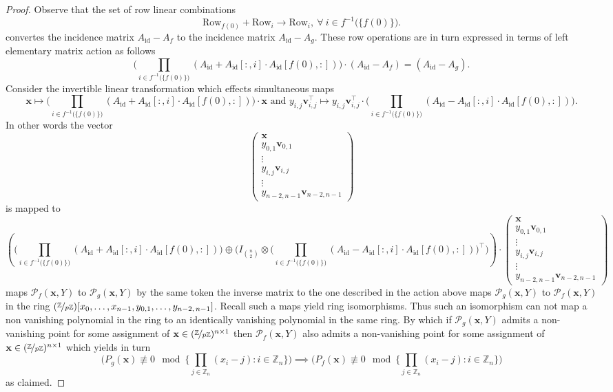 \begin{proof}
Observe that the set of row linear combinations
\[
\text{Row}_{f(0)}+\text{Row}_{i}\longrightarrow\text{Row}_{i},\ \forall\:i\in f^{-1}\big(\{f(0)\}\big).
\]
convertes the incidence matrix $A_{\text{id}}-A_{f}$ to the incidence matrix $A_{\text{id}}-A_{g}$.
These row operations are in turn expressed in terms of left elementary matrix action as follows
\[
\bigg(\prod_{i\in f^{-1}\big(\{f(0)\}\big)}(A_{\text{id}}+A_{\text{id}}[:,i]\cdot A_{\text{id}}[f(0),:])\bigg)\cdot(A_{\text{id}}-A_{f})=(A_{\text{id}}-A_{g}).
\]
Consider the invertible linear transformation which effects simultaneous maps
\[
\mathbf{x}\mapsto\bigg(\prod_{i\in f^{-1}\big(\{f(0)\}\big)}(A_{\text{id}}+A_{\text{id}}[:,i]\cdot A_{\text{id}}[f(0),:])\bigg)\cdot\mathbf{x}\text{ and }y_{i,j}\mathbf{v}_{i,j}^{\top}\mapsto y_{i,j}\mathbf{v}_{i,j}^{\top}\cdot\bigg(\prod_{i\in f^{-1}\big(\{f(0)\}\big)}(A_{\text{id}}-A_{\text{id}}[:,i]\cdot A_{\text{id}}[f(0),:])\bigg).
\]
In other words the vector
\[
\left(\begin{array}{c}
\mathbf{x}\\
y_{0,1}\mathbf{v}_{0,1}\\
\vdots\\
y_{i,j}\mathbf{v}_{i,j}\\
\vdots\\
y_{n-2,n-1}\mathbf{v}_{n-2,n-1}
\end{array}\right)
\]
is mapped to
\[
\left(\big(\prod_{i\in f^{-1}\big(\{f(0)\}\big)}(A_{\text{id}}+A_{\text{id}}[:,i]\cdot A_{\text{id}}[f(0),:])\big)\oplus\bigg(I_{{n \choose 2}}\otimes\big(\prod_{i\in f^{-1}\big(\{f(0)\}\big)}(A_{\text{id}}-A_{\text{id}}[:,i]\cdot A_{\text{id}}[f(0),:])\big)^{\top}\bigg)\right)\cdot\left(\begin{array}{c}
\mathbf{x}\\
y_{0,1}\mathbf{v}_{0,1}\\
\vdots\\
y_{i,j}\mathbf{v}_{i,j}\\
\vdots\\
y_{n-2,n-1}\mathbf{v}_{n-2,n-1}
\end{array}\right)
\]
maps $\mathcal{P}_{f}(\mathbf{x},Y)$ to $\mathcal{P}_{g}(\mathbf{x},Y)$ by the same token the inverse matrix to the one described in the action above maps  $\mathcal{P}_{g}(\mathbf{x},Y)$ to $\mathcal{P}_{f}(\mathbf{x},Y)$ in the ring $(\nicefrac{\mathbb{Z}}{p\mathbb{Z}})[x_{0},\ldots,x_{n-1},y_{0,1},\ldots ,y_{n-2,\,n-1}]$. Recall such a maps yield ring isomorphisms. Thus such an isomorphism can not map a non vanishing polynomial in the ring to an identically vanishing polynomial in the same ring. By which if $\mathcal{P}_{g}(\mathbf{x},Y)$ admits a non-vanishing point for some assignment of $\mathbf{x} \in (\nicefrac{\mathbb{Z}}{p\mathbb{Z}})^{n\times 1}$ then $\mathcal{P}_{f}(\mathbf{x},Y)$ also admits a non-vanishing point for some assignment of $\mathbf{x} \in (\nicefrac{\mathbb{Z}}{p\mathbb{Z}})^{n\times 1}$ which yields in turn
\[
\big(P_{g}(\mathbf{x})\not\equiv0\mod\big\{\underset{j\in\mathbb{Z}_{n}}{\prod}(x_{i}-j):i\in\mathbb{Z}_{n}\big\}\big)\implies\big(P_{f}(\mathbf{x})\not\equiv0\mod\big\{\underset{j\in\mathbb{Z}_{n}}{\prod}(x_{i}-j):i\in\mathbb{Z}_{n}\big\}\big)
\]
as claimed.
\end{proof}


